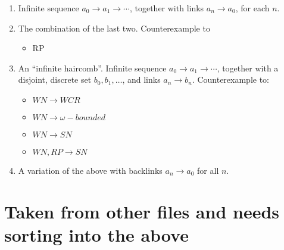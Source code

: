 \documentclass{article}
\begin{document}
\begin{enumerate}
  \item Infinite sequence $a_0 \to a_1 \to \cdots$, together with links
  $a_n \to a_0$, for each $n$.
  \item The combination of the last two.
  Counterexample to
  \begin{itemize}
    \item RP
  \end{itemize}
  \item An ``infinite haircomb''. Infinite sequence $a_0 \to a_1 \to \cdots$, together with
  a disjoint, discrete set $b_0, b_1, \dots$, and links $a_n \to b_n$.
  Counterexample to:
  \begin{itemize}
    \item $WN\to WCR$
    \item $WN\to \omega-bounded$
    \item $WN \to SN$
    \item $WN,RP \to SN$
  \end{itemize}
  \item A variation of the above with backlinks $a_n \to a_0$ for all $n$.
\end{enumerate}

\section{Taken from other files and needs sorting into the above}
\end{document}
